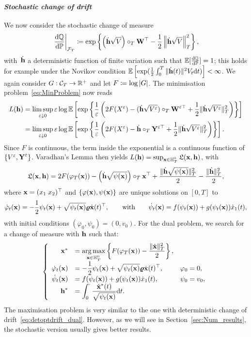 \paragraph{\textit{Stochastic change of drift}}
We now consider the stochastic change of measure 
$$
\left.\frac{\D\QQ}{\D\PP}\right|_{\Ff_T} \defEqual \exp\left\{\left(\dot{\hh}\sqrt{V}\right)\cT \Wf^\top - \frac{1}{2}\left\|\dot{\hh}\sqrt{V}\right\|_{T}^2\right\},
$$
with~$\dot{\hh}$ a deterministic function of finite variation such that $\EE[\frac{\D\QQ}{\D \PP}]=1$;
this holds for example under the Novikov condition $\EE\left [\exp(\frac{1}{2}\int_0^T \|\dot{\hh}(t)\|^2 V_t \D t)\right ]<\infty$. 
We again consider $G:\Cc_T\rightarrow\nobreak\RR^+$ and let $F\defEqual\log|G|$. 
The minimisation problem~\eqref{eq:MinProblem} now reads
\begin{align*}
L(\hh) &=\limsup\limits_{\eps\downarrow 0}\eps
\log\EE\left[\exp\left\{\frac{1}{\eps}\left(2F(X^{\eps}) - (\dot{\hh}\sqrt{V^{\eps}}) \cT \Wf^{\eps\top} + \frac{1}{2}\|\dot{\hh}\sqrt{V^\eps}\|_{T}^2\right)\right\}\right]\\
&= \limsup\limits_{\eps\downarrow 0}\eps\log\EE\left[\exp\left\{\frac{1}{\eps}\left(2F(X^{\eps}) - \dot{\hh} \cT \Yf^{\eps\top} + \frac{1}{2}\|\dot{\hh}\sqrt{V^\eps}\|_{T}^2\right)\right\}\right].
\end{align*}
Since $F$ is continuous, the term inside the exponential is a continuous function of $\{V^{\eps},\Yf^{\eps}\}$. 
Varadhan's Lemma then yields
$L(\hh) = \sup_{\xx\in \HH_T^0}\Lf(\xx,\hh)$,
with 
$$
\Lf(\xx,\hh) = 2F(\varphi_T(\xx)) - \left(\dot{\hh}\sqrt{\psi(\xx)}\right)\cT \xx^\top + \frac{\|\dot{\hh}\sqrt{\psi(\xx)}\|_{T}^2}{2} - \frac{\|\dot{\hh}\|_{T}^2}{2},
$$
where $\xx = (x_1 \; x_2)^\top$ and $\{\varphi(\xx),\psi(\xx)\}$ are unique solutions on $[0,T]$ to
$$
\dot{\varphi}_t(\xx) = -\frac{1}{2}\psi_t(\xx) + \sqrt{\psi_t(\xx)} \vrho\dot{\xx}(t)^\top,
\qquad\text{with}\qquad
\dot{\psi}_t(\xx) = f(\psi_t(\xx)) + g(\psi_t(\xx)) \dot{x}_1(t),
$$
with initial conditions $(\varphi_0,\psi_0) = (0,v_0)$. 
For  the dual problem, we search for a change of measure with $\hh$ such that:
\begin{equation}\label{eq:detoptstochdrift_dual}
\left\{
\begin{array}{rll}
\xx^* & = \displaystyle \argmax\limits_{\xx\in \HH_T^0} 
\left\{F(\varphi_T(\xx)) - \frac{\|\dot{\xx}\|_{T}^2}{2}\right\},\\
\dot{\varphi}_t(\xx) & = \displaystyle -\frac{1}{2}\psi_t(\xx) + \sqrt{\psi_t(\xx)} \vrho \dot{\xx}(t)^\top, & \varphi_0 = 0,\\
\dot{\psi}_t(\xx) & = \displaystyle f(\psi_t(\xx)) + g(\psi_t(\xx)) \dot{x}_1(t), & \psi_0 = v_0,\\
\hh^* & = \displaystyle \int_{0}^{\cdot}\frac{\dot{\xx}^*(t)}{\sqrt{\psi_t(\xx)}}\D t.
\end{array}
\right.
\end{equation}
The maximisation problem is very similar to the one with deterministic change of drift~\eqref{eq:detoptdrift_dual}. 
However, as we will see in Section~\ref{sec:Num_results}, the stochastic version usually gives better results.

